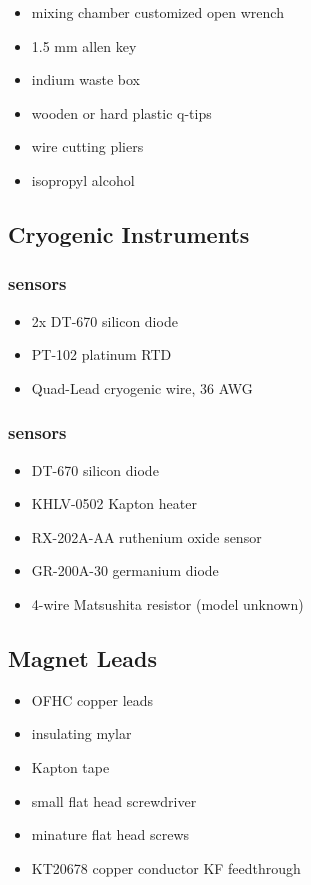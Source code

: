 \begin{itemize}
  \item mixing chamber customized open wrench
  \item 1.5 mm allen key
  \item indium waste box
  \item wooden or hard plastic q-tips
  \item wire cutting pliers
  \item isopropyl alcohol 
\end{itemize}


  \subsection{Cryogenic Instruments}

\subsubsection{\hef{} sensors}
  \begin{itemize}
   \item 2x  DT-670 silicon diode
\item {} PT-102 platinum RTD
\item {} Quad-Lead cryogenic wire, 36 AWG
  \end{itemize}
\subsubsection{\het{} sensors}
\begin{itemize}
 \item {} DT-670 silicon diode
 \item {} KHLV-0502 Kapton heater
 \item {} RX-202A-AA ruthenium oxide sensor
 \item {} GR-200A-30 germanium diode
 \item 4-wire Matsushita resistor (model unknown) 

\end{itemize}

  \subsection{Magnet Leads}
\begin{itemize}
 \item OFHC copper leads
\item insulating mylar
\item Kapton tape
\item small flat head screwdriver
\item minature flat head screws
\item {} KT20678 copper conductor KF feedthrough
\end{itemize}


